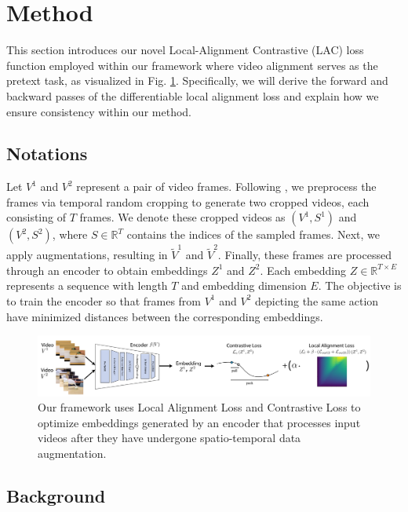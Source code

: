 \section{Method}

This section introduces our novel Local-Alignment Contrastive (LAC) loss function employed within our framework where video alignment serves as the pretext task, as visualized in Fig. \ref{fig: vis_method}. Specifically, we will derive the forward and backward passes of the differentiable local alignment loss and explain how we ensure consistency within our method.

\subsection{Notations} \label{sec: 3_notation}

Let $V^1$ and $V^2$ represent a pair of video frames. 
Following \cite{2022_carl}, we preprocess the frames via temporal random cropping to generate two cropped videos, each consisting of $T$ frames.
We denote these cropped videos as $(V^1, S^1)$ and $(V^2, S^2)$, where $S \in \mathbb{R}^T$ contains the indices of the sampled frames. 
Next, we apply augmentations, resulting in $\widetilde{V}^1$ and $\widetilde{V}^2$. 
Finally, these frames are processed through an encoder to obtain embeddings $Z^1$ and $Z^2$.
Each embedding $Z \in \mathbb{R}^{T \times E}$ represents a sequence with length $T$ and embedding dimension $E$.
The objective is to train the encoder so that frames from $V^1$ and $V^2$ depicting the same action have minimized distances between the corresponding embeddings.

\begin{figure}[t]
\includegraphics[width=1\textwidth]{images/a2.png}
\caption{Our framework uses Local Alignment Loss and Contrastive Loss to optimize embeddings generated by an encoder that processes input videos after they have undergone spatio-temporal data augmentation.}
\label{fig: vis_method}
\end{figure}
\subsection{Background}

